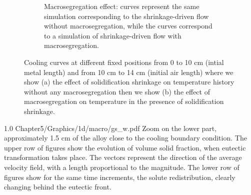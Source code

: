 \begin{figure}[htbp]
\begin{subfigure}[t]{0.8\textwidth}
	\caption{Macrosegregation effect:  curves represent the same simulation corresponding to the shrinkage-driven flow without macrosegregation, while
	the  curves correspond to a simulation of shrinkage-driven flow with macrosegregation.}
    \label{fig:macro_effect}
  \end{subfigure}
\caption{Cooling curves at different fixed positions from 0 to 10 cm (intial metal length) and from 10 cm to 14 cm (initial air length) 
where we show (a) the effect of solidification shrinkage on temperature history without any macrosegregation then
we show (b) the effect of macrosegregation on temperature in the presence of solidification shrinkage.} 
\label{fig:1dasi7_macro_shrinkage}
\end{figure}

\begin{figureth}
{1.0}
{Chapter5/Graphics/1d/macro/gs_w.pdf}
{Zoom on the lower part, approximately 1.5 cm of the alloy close to the cooling boundary condition. 
The upper row of figures show the evolution of volume solid fraction, when eutectic transformation takes place. 
The vectors represent the direction of the average velocity field, with a length proportional
to the magnitude. The lower row of figures show for the same time increments, the solute redistribution, 
clearly changing behind the eutectic front.}
\label{fig:1dalsi7_gs_w}
\end{figureth}

